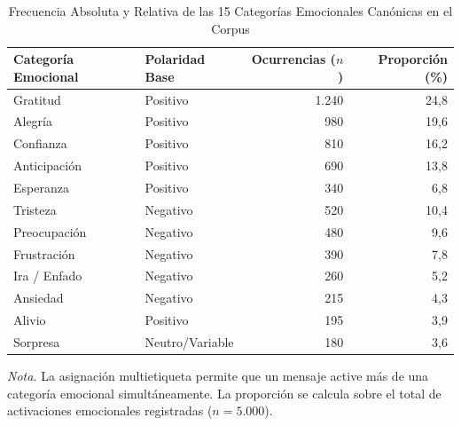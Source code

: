 \begin{table}[htbp]
  \centering
  \small
  \caption{Frecuencia Absoluta y Relativa de las 15 Categorías Emocionales Canónicas en el Corpus}
  \label{tab:frecuencia_emociones}
  \begin{tabular}{llrr}
    \toprule
    Categoría Emocional & Polaridad Base & Ocurrencias ($n$) & Proporción (\%) \\
    \midrule
    Gratitud            & Positivo       & 1.240             & 24,8            \\
    Alegría             & Positivo       & 980               & 19,6            \\
    Confianza           & Positivo       & 810               & 16,2            \\
    Anticipación        & Positivo       & 690               & 13,8            \\
    Esperanza           & Positivo       & 340               & 6,8             \\
    Tristeza            & Negativo       & 520               & 10,4            \\
    Preocupación        & Negativo       & 480               & 9,6             \\
    Frustración         & Negativo       & 390               & 7,8             \\
    Ira / Enfado        & Negativo       & 260               & 5,2             \\
    Ansiedad            & Negativo       & 215               & 4,3             \\
    Alivio              & Positivo       & 195               & 3,9             \\
    Sorpresa            & Neutro/Variable& 180               & 3,6             \\
    \bottomrule
  \end{tabular}
  \vspace{4pt}
  \begin{minipage}{0.92\textwidth}
    \footnotesize
    \textit{Nota.} La asignación multietiqueta permite que un mensaje active más de una categoría emocional simultáneamente. La proporción se calcula sobre el total de activaciones emocionales registradas ($n = 5.000$).
  \end{minipage}
\end{table}
